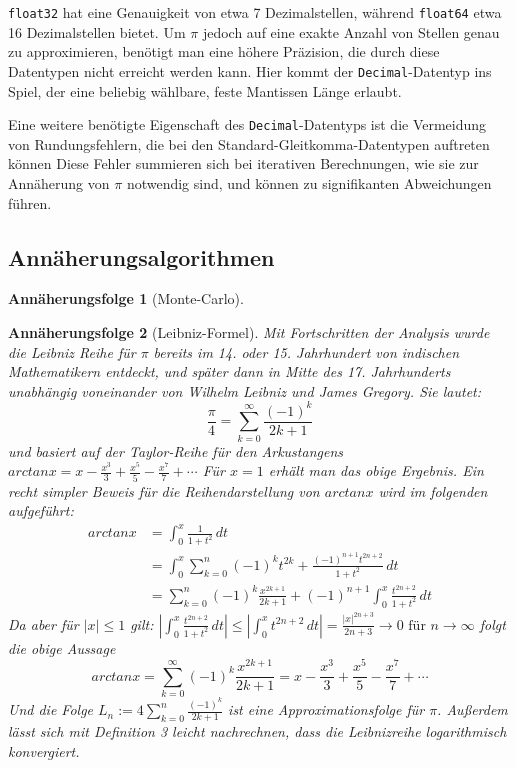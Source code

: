 \documentclass{scrartcl}
\newtheorem{approximation sequence}{Annäherungsfolge}
\begin{document}
\texttt{float32} hat eine Genauigkeit von etwa 7 Dezimalstellen, während
\texttt{float64} etwa 16 Dezimalstellen bietet.
Um \(\pi\) jedoch auf eine exakte Anzahl von Stellen genau zu approximieren,
benötigt man eine höhere Präzision, die durch diese Datentypen nicht erreicht
werden kann.
Hier kommt der \texttt{Decimal}-Datentyp ins Spiel, der eine beliebig wählbare,
feste Mantissen Länge erlaubt.

Eine weitere benötigte Eigenschaft des \texttt{Decimal}-Datentyps ist die
Vermeidung von Rundungsfehlern, die bei den Standard-Gleitkomma-Datentypen
auftreten können Diese Fehler summieren sich bei iterativen Berechnungen, wie
sie zur Annäherung von \(\pi\) notwendig sind, und können zu signifikanten
Abweichungen führen.

\subsection{Annäherungsalgorithmen}

\begin{approximation sequence}[Monte-Carlo]

\end{approximation sequence}

\begin{approximation sequence}[Leibniz-Formel]
Mit Fortschritten der Analysis wurde die Leibniz Reihe für \(\pi\) bereits im 14. 
oder 15. Jahrhundert von indischen Mathematikern entdeckt, und später dann in 
Mitte des 17. Jahrhunderts unabhängig voneinander von Wilhelm Leibniz und James Gregory.
Sie lautet:
\[ \frac{\pi}{4} = \sum_{k=0}^{\infty} \frac{(-1)^k}{2k+1} \]
und basiert auf der Taylor-Reihe für den Arkustangens \(arctanx = x - \frac{x^3}{3} + \frac{x^5}{5} - \frac{x^7}{7} + \cdots \)
Für \(x = 1\) erhält man das obige Ergebnis.
Ein recht simpler Beweis für die Reihendarstellung von \(arctanx\) wird im folgenden aufgeführt: \cite{Leibniz}
\begin{equation} 
    \begin{split}
    arctanx & = \int_{0}^{x} \frac{1}{1+t^2}\,dt \\
    & = \int_{0}^{x}\sum_{k=0}^{n}(-1)^k t^{2k} + \frac{(-1)^{n+1}t^{2n+2}}{1+t^2}\,dt \\
    & = \sum_{k=0}^{n}(-1)^k \frac{x^{2k+1}}{2k+1} + (-1)^{n+1}\int_{0}^{x}\frac{t^{2n+2}}{1+t^2}\,dt
    \end{split}
    \end{equation}
Da aber für \(|x| \leqslant 1\) gilt: \(|\int_{0}^{x}\frac{t^{2n+2}}{1+t^2}\,dt| \leqslant |\int_{0}^{x}t^{2n+2}\,dt| = \frac{|x|^{2n+3}}{2n+3} \rightarrow 0 \text{ für } n \rightarrow \infty \)
folgt die obige Aussage
\[arctanx = \sum_{k=0}^{\infty}(-1)^k \frac{x^{2k+1}}{2k+1} = x - \frac{x^3}{3} + \frac{x^5}{5} - \frac{x^7}{7} + \cdots \] 
Und die Folge \(L_n := 4\sum_{k=0}^{n} \frac{(-1)^k}{2k+1} \) ist eine Approximationsfolge für \(\pi\).
Außerdem lässt sich mit Definition 3 leicht nachrechnen, dass die Leibnizreihe logarithmisch konvergiert. 
\end{approximation sequence}
\end{document}
